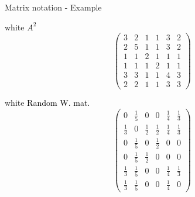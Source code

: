 \begin{textbox}{Matrix notation - Example}
\begin{multibox}{2}
    \begin{subbox}{white}{\textcolor{black}{ $A^2$}}
      \centering
      \footnotesize
      \[\begin{pmatrix}
          3 & 2 & 1 & 1 & 3 & 2 \\
          2 & 5 & 1 & 1 & 3 & 2 \\
          1 & 1 & 2 & 1 & 1 & 1 \\
          1 & 1 & 1 & 2 & 1 & 1 \\
          3 & 3 & 1 & 1 & 4 & 3 \\
          2 & 2 & 1 & 1 & 3 & 3
        \end{pmatrix}
      \]
    \end{subbox}
    \begin{subbox}{white}{\textcolor{black}{ Random W. mat.}}
      \centering
      \footnotesize
      \setlength\arraycolsep{3pt}
      \[\begin{pmatrix}
          0           & \frac{1}{5} & 0           & 0           & \frac{1}{4} & \frac{1}{3} \\[6pt]
          \frac{1}{3} & 0           & \frac{1}{2} & \frac{1}{2} & \frac{1}{4} & \frac{1}{3} \\[6pt]
          0           & \frac{1}{5} & 0           & \frac{1}{2} & 0           & 0           \\[6pt]
          0           & \frac{1}{5} & \frac{1}{2} & 0           & 0           & 0           \\[6pt]
          \frac{1}{3} & \frac{1}{5} & 0           & 0           & \frac{1}{4} & \frac{1}{3} \\[6pt]
          \frac{1}{3} & \frac{1}{5} & 0           & 0           & \frac{1}{4} & 0
        \end{pmatrix}
      \]
    \end{subbox}
  \end{multibox}
\end{textbox}


